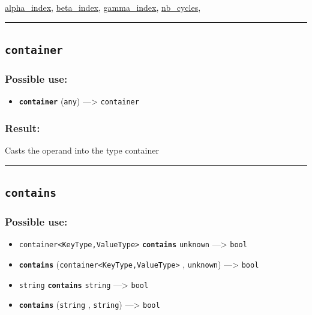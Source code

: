 \documentclass[]{book}
\providecommand{\tightlist}{%
  \setlength{\itemsep}{0pt}\setlength{\parskip}{0pt}}
\theoremstyle{definition}
\theoremstyle{definition}
\theoremstyle{definition}
\theoremstyle{remark}
\begin{document}
\href{operators-a-to-a.html\#alpha_index}{alpha\_index},
\href{operators-b-to-c.html\#beta_index}{beta\_index},
\href{operators-d-to-h.html\#gamma_index}{gamma\_index},
\href{operators-n-to-r.html\#nb_cycles}{nb\_cycles},

\begin{center}\rule{0.5\linewidth}{\linethickness}\end{center}

\subsection{\texorpdfstring{\texttt{container}}{container}}\label{container}

\subsubsection{Possible use:}\label{possible-use-98}

\begin{itemize}
\tightlist
\item
  \textbf{\texttt{container}} (\texttt{any}) ---\textgreater{}
  \texttt{container}
\end{itemize}

\subsubsection{Result:}\label{result-96}

Casts the operand into the type container

\begin{center}\rule{0.5\linewidth}{\linethickness}\end{center}

\subsection{\texorpdfstring{\texttt{contains}}{contains}}\label{contains}

\subsubsection{Possible use:}\label{possible-use-99}

\begin{itemize}
\tightlist
\item
  \texttt{container\textless{}KeyType,ValueType\textgreater{}}
  \textbf{\texttt{contains}} \texttt{unknown} ---\textgreater{}
  \texttt{bool}
\item
  \textbf{\texttt{contains}}
  (\texttt{container\textless{}KeyType,ValueType\textgreater{}} ,
  \texttt{unknown}) ---\textgreater{} \texttt{bool}
\item
  \texttt{string} \textbf{\texttt{contains}} \texttt{string}
  ---\textgreater{} \texttt{bool}
\item
  \textbf{\texttt{contains}} (\texttt{string} , \texttt{string})
  ---\textgreater{} \texttt{bool}
\end{itemize}
\end{document}
